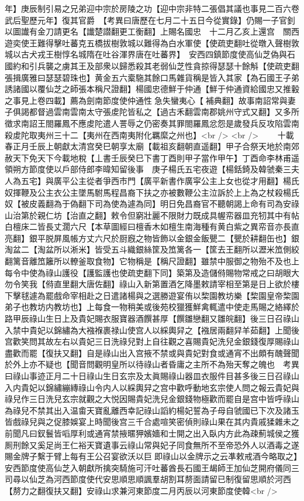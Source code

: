年】庚辰制引易之兄弟迎中宗於房陵之功【迎中宗非特二張倡其議也事見二百六卷武后聖歷元年】復其官爵　【考異曰唐歷在七月二十五日今從實錄】仍賜一子官釗以圖䜟有金刀請更名【䜟楚譛翻更工衡翻】上賜名國忠　十二月乙亥上還宫　關西遊奕使王難得擊吐蕃克五橋拔樹敦城以難得為白水軍使【使疏吏翻吐從暾入聲樹敦城以古犬戎王樹惇名城隋在吐谷渾界唐在吐蕃界】　安西四鎮節度使高仙芝偽與石國約和引兵襲之虜其王及部衆以歸悉殺其老弱仙芝性貪掠得瑟瑟十餘斛【使疏吏翻張揖廣雅曰瑟瑟碧珠也】黄金五六槖駞其餘口馬雜貨稱是皆入其家【為石國王子弟誘諸國以覆仙芝之師張本稱尺證翻】楊國忠德鮮于仲通【鮮于仲通資給國忠又推轂之事見上卷四載】薦為劍南節度使仲通性急失蠻夷心【補典翻】故事南詔常與妻子俱謁都督過雲南雲南太守張䖍陀皆私之【過古禾翻雲南郡姚州守式又翻】又多所徵求南詔王閤羅鳳不應䖍陀遣人詈辱之仍密奏其罪閤羅鳳忿怨是歲發兵反攻陷雲南殺䖍陀取夷州三十二【夷州在西南夷附化羈縻之州也】<br />
<br />
　　十載春正月壬辰上朝獻太清宫癸巳朝享太廟【載祖亥翻朝直遥翻】甲子合祭天地於南郊赦天下免天下今載地稅【丄書壬辰癸巳下書丁酉則甲子當作甲午】丁酉命李林甫遥領朔方節度使以戶部侍郎李暐知留後事　庚子楊氏五宅夜遊【楊銛錡及韓虢秦三夫人為五宅】與廣平公主從者爭西市門【廣平新書作廣寜公主上女也從才用翻】楊氏奴揮鞭及公主衣公主墜馬駙馬程昌裔下扶之亦被數鞭公主泣訴於上上為之杖殺楊氏奴【被皮義翻為于偽翻下司為使為遽為同】明日免昌裔官不聽朝謁上命有司為安祿山治第於親仁坊【治直之翻】敕令但窮壯麗不限財力既成具幄帟器皿充牣其中有帖白檀床二皆長丈濶六尺【本草圖經曰檀香木如檀生南海種有黄白紫之異帟音亦長直亮翻】銀平脱屏風帳方丈六尺於厨廐之物皆飾以金銀金飯甖二【甖於耕翻缶也】銀淘盆二【淘盆所以淅米】皆受五斗織銀絲筐及笟篱各一【筐去王翻所以瀝米笟側絞翻篱音離笟籬所以轑釜取食物】它物稱是【稱尺證翻】雖禁中服御之物殆不及也上每令中使為祿山護役【護監護也使疏吏翻下同】築第及造儲偫賜物常戒之曰胡眼大勿令笑我【偫直里翻大唐佐翻】祿山入新第置酒乞降墨敕請宰相至第是日上欲於樓下擊毬遽為罷戲命宰相赴之日遣諸楊與之選勝遊宴侑以棃園教坊樂【棃園皇帝棃園弟子也教坊内教坊也】上每食一物稍美或後苑校獵獲鮮禽輒遣中使走馬賜之絡繹於路甲辰祿山生日上及貴妃賜衣服寶器酒饌甚厚【饌雛戀翻又雛皖翻】後三日召祿山入禁中貴妃以錦繡為大襁褓裹禄山使宫人以綵輿舁之【襁居兩翻舁羊茹翻】上聞後宫歡笑問其故左右以貴妃三日洗祿兒對上自往觀之喜賜貴妃洗兒金銀錢復厚賜祿山盡歡而罷【復扶又翻】自是祿山出入宫掖不禁或與貴妃對食或通宵不出頗有醜聲聞於外上亦不疑也【聞音問觀明皇所以待祿山者昏庸之主所不為殆天奪之魄也　考異曰祿山事迹正月二十日祿山生日玄宗及太眞賜祿山器皿衣服件目甚多後三日召祿山入内貴妃以錦繡繃縳祿山令内人以綵輿舁之宫中歡呼動地玄宗使人問之報云貴妃與祿兒作三日洗兒玄宗就觀之大悦因賜貴妃洗兒金銀錢物極歡而罷自是宫中皆呼祿山為祿兒不禁其出入温畬天寶亂離西幸記祿山謟約楊妃誓為子母自虢國已下次及諸玉皆戲祿兒與之促膝娛宴上時聞後宫三千合處喧笑密偵則祿山果在其内貴戚猱雜未之前聞凡曰釵鬟皆㗖厚利或通宵禁掖暱狎嬪嬙和士開之出入臥内方此為疎薊城侯之獲厠刑餘又奚足尚王仁裕天寶遺事云祿山常與妃子同食無所不至帝恐外人以酒毒之遂賜金牌子繫于臂上每有王公召宴欲沃以巨即祿山以金牌示之云凖敕戒酒今略取之】　安西節度使高仙芝入朝獻所擒突騎施可汗吐蕃酋長石國王朅師王加仙芝開府儀同三司尋以仙芝為河西節度使代安思順思順諷羣胡割耳剺面請留已制復留思順於河西【剺力之翻復扶又翻】安祿山求兼河東節度二月丙辰以河東節度使韓<br />
